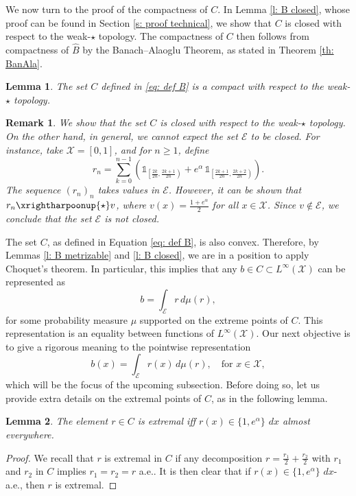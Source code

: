 \documentclass[a4paper, 11pt]{article}
\newtheorem{lem}{Lemma}
\newtheorem{rem}{Remark}
\theoremstyle{definition}
\newcommand{\cE}{{\mathcal{E}}}
\newcommand{\cX}{{\mathcal{X}}}
\newcommand{\theconvex}{C}
\newcommand{\indi}[1]{\mathds{1}_{#1}}
\begin{document}
{We now turn to the proof of the compactness of \( C \). In Lemma \ref{l: B closed}, whose proof can be found in Section \ref{s: proof technical}, we show that \( \theconvex \) is closed with respect to the weak-\(\star\) topology. The compactness of \( \theconvex \) then follows from compactness of $\widehat{B}$ by the Banach–Alaoglu Theorem, as stated in Theorem \ref{th: BanAla}.

\begin{lem}{\label{l: B closed}}
The set $\theconvex$ defined in \eqref{eq: def B} is a compact with respect to the weak-$\star$ topology.  
\end{lem}

\begin{rem}\label{rem : E not closed}
We show that the set $\theconvex$ is closed with respect to the weak-$\star$ topology. On the other hand, in general, we cannot expect the set $\cE$ to be closed. For instance, take $\cX = [0,1]$, and for $n \ge 1$, define  
\[
r_n = \sum_{k=0}^{n-1} \left( \indi{\left[\frac{2k}{2n}, \frac{2k+1}{2n}\right)} + e^\alpha \, \indi{\left[\frac{2k+1}{2n}, \frac{2k+2}{2n}\right)} \right).
\]
The sequence $(r_n)_n$ takes values in $\cE$. However, it can be shown that $r_n \xrightharpoonup{\star} v$, where $v(x) = \frac{1 + e^\alpha}{2}$ for all $x \in \cX$. Since $v \notin \cE$, we conclude that the set $\cE$ is not closed.

\end{rem}

The set \( C \), as defined in Equation \eqref{eq: def B}, is also convex. Therefore, by Lemmas \ref{l: B metrizable} and \ref{l: B closed}, we are in a position to apply Choquet’s theorem. In particular, this implies that any \( b \in C \subset L^\infty(\mathcal{X}) \) can be represented as  
\[
b = \int_{\mathcal{E}} r \, d\mu(r),
\]  
for some probability measure \( \mu \) supported on the extreme points of \( C \). This representation is an equality between functions of $L^\infty(\cX)$. 
Our next objective is to give a rigorous meaning to the pointwise representation  
\[
b(x) = \int_{\mathcal{E}} r(x) \, d\mu(r), \quad \text{for } x \in \mathcal{X},
\]  
which will be the focus of the upcoming subsection. Before doing so, let us provide extra details on the extremal points of $\theconvex$, as in the following lemma.

\begin{lem}\label{lem : extremal points}
The element	$r \in C$ is extremal iff $r(x)\in \{1,e^\alpha\}$ $dx$ almost everywhere. 
\end{lem}
\begin{proof}
We recall that $r$ is extremal in $\theconvex$ if any decomposition $r = \frac{r_1}{2} + \frac{r_2}{2}$ with $r_1$ and $r_2$ in $\theconvex$ implies $r_1 = r_2 = r$ a.e.. It is then clear that if $r(x) \in \{1, e^\alpha\}$ $dx$-a.e., then $r$ is extremal.  


\end{proof}}
\end{document}
